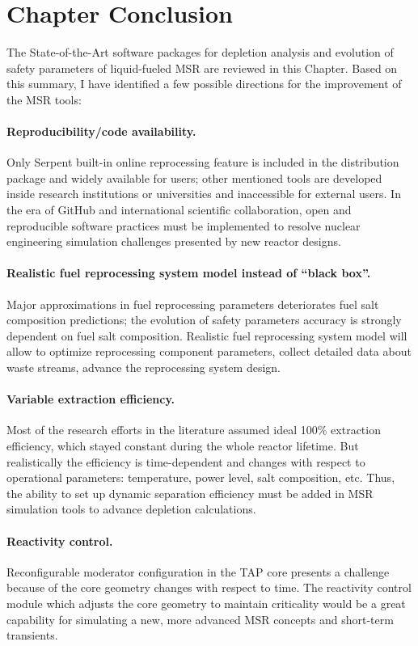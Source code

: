 \section{Chapter Conclusion}
The State-of-the-Art software packages for depletion analysis and evolution of 
safety parameters of liquid-fueled \gls{MSR} are reviewed in this Chapter. 
Based on this summary, I have identified a few possible directions for 
the improvement of the \gls{MSR} tools:
\paragraph{Reproducibility/code availability.} Only Serpent built-in online 
reprocessing feature is included in the distribution package and widely 
available for users; other mentioned tools are developed inside research 
institutions or universities and inaccessible for external users. In the era 
of GitHub \cite{github_github_2015} and international scientific 
collaboration, open and reproducible software practices must be implemented to 
resolve nuclear engineering simulation challenges presented by new reactor 
designs.
\paragraph{Realistic fuel reprocessing system model instead of ``black box''.} 
Major approximations in fuel reprocessing parameters deteriorates fuel salt 
composition predictions; the evolution of safety parameters accuracy is 
strongly dependent on fuel salt composition. Realistic fuel reprocessing 
system model will allow to optimize reprocessing component parameters, collect 
detailed data about waste streams, advance the reprocessing system design.
\paragraph{Variable extraction efficiency.} Most of the research efforts in 
the literature assumed ideal 100\% extraction efficiency, which stayed 
constant during the whole reactor lifetime. But realistically the efficiency 
is time-dependent and changes with respect to operational parameters: 
temperature, power level, salt composition, etc. Thus, the ability to set up 
dynamic separation efficiency must be added in \gls{MSR} simulation tools to 
advance depletion calculations.
\paragraph{Reactivity control.} Reconfigurable moderator configuration in the 
\gls{TAP} core presents a challenge because of the core geometry changes with 
respect to time. The reactivity control module which adjusts the core geometry 
to maintain criticality would be a great capability for simulating a new, more 
advanced \gls{MSR} concepts and short-term transients.
